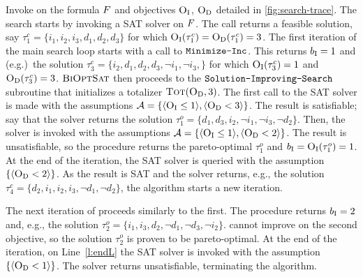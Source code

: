 \begin{example}\label{ex:main-iteration}
  Invoke \algname{} on the formula $F$ and objectives $\textsc{O}_{\text{I}}$, $\textsc{O}_{\text{D}}$ detailed in \cref{fig:search-trace}. 
  The search starts by invoking a SAT solver on $F$.
  The call returns a feasible solution, say $\tau^c_1 = \{i_1, i_2, i_3, d_1, d_2, d_3\}$ for which  $\textsc{O}_{\text{I}}(\tau^c_1) = \textsc{O}_{\text{D}}(\tau^c_1) = 3$. 
  The first iteration of the main search loop starts with a call to $\texttt{Minimize-\allowbreak{}Inc}$.
  This returns $b_{\text{I}} = 1$ and (e.g.)\ the solution $\tau^c_3 = \{ i_2, d_1, d_2, d_3, \lnot i_1, \lnot i_3,\}$ for which $\textsc{O}_{\text{I}}(\tau^c_3) = 1$ and $\textsc{O}_{\text{D}}(\tau^c_3) = 3$. $\textsc{BiOptSat}$ then proceeds to the $\texttt{Solution-\allowbreak{}Improving-\allowbreak{}Search}$ subroutine that initializes a  totalizer $\textsc{Tot}(\textsc{O}_{\text{D}}, 3)$.
  The first call to the SAT solver is made with the assumptions $\mathcal{A} = \{ \langle \textsc{O}_{\text{I}} \leq 1 \rangle, \langle \textsc{O}_{\text{D}} < 3 \rangle \}$.
  The result is satisfiable;
  say that the solver returns the solution $\tau^o_1 = \{d_1, d_3, i_2, \lnot i_1, \lnot i_3, \lnot d_2\}$.
  Then, the solver is invoked with the assumptions $\mathcal{A} =  \{ \langle \textsc{O}_{\text{I}} \leq 1 \rangle, \langle \textsc{O}_{\text{D}} < 2 \rangle \}$.
  The result is unsatisfiable, so the procedure returns the pareto-optimal $\tau^o_1$ and $b_{\text{I}} = \textsc{O}_{\text{I}}(\tau^o_1) = 1$.
  At the end of the iteration, the SAT solver is queried with the assumption $\{ \langle \textsc{O}_{\text{D}} < 2 \rangle \}$.
  As the result is SAT and the solver returns, e.g., the solution $\tau^c_4 = \{ d_2, i_1, i_2, i_3, \lnot d_1, \lnot d_2 \}$,
  the algorithm starts a new iteration.

  The next iteration of \algname{} proceeds similarly to the first.
  The procedure \Min{} returns $b_{\text{I}} = 2$ and, e.g., the solution $\tau^o_2 = \{ i_1, i_3, d_2, \lnot d_1, \lnot d_3, \lnot i_2\}$.
  \Simpr{} cannot improve on the second objective, so the solution $\tau^o_2$ is proven to be pareto-optimal.
  At the end of the iteration, on Line~\ref{l:endL} the SAT solver is invoked with the assumption $\{\langle \textsc{O}_{\text{D}} < 1 \rangle\}$.
  The solver returns unsatisfiable, terminating the algorithm. 
\end{example}

